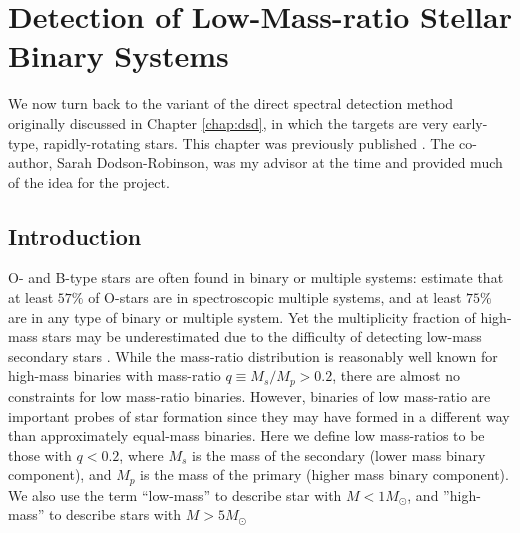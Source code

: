 

\chapter{Detection of Low-Mass-ratio Stellar Binary Systems}
\label{chap:pilot}
We now turn back to the variant of the direct spectral detection method originally discussed in Chapter \ref{chap:dsd}, in which the targets are very early-type, rapidly-rotating stars. This chapter was previously published \citep{Gullikson2013_2}. The co-author, Sarah Dodson-Robinson, was my advisor at the time and provided much of the idea for the project.


\section{Introduction}
O- and B-type stars are often found in binary or
multiple systems: \cite{Mason2009} estimate that at least $57\%$ of O-stars are
in spectroscopic multiple systems, and at least $75\%$ are in any type of binary or multiple system.
Yet the multiplicity fraction of high-mass stars may be underestimated due to the difficulty of detecting low-mass secondary stars \citep{Sana2011}.  While the mass-ratio distribution
is reasonably well known for high-mass binaries with mass-ratio $q \equiv M_s/M_p > 0.2$, there are almost no
constraints for low mass-ratio binaries. However, binaries of low mass-ratio are important probes of star formation since they may have
formed in a different way than approximately equal-mass binaries. Here we define low mass-ratios to be 
those with $q < 0.2$, where $M_s$ is the mass of the secondary (lower mass binary component), and $M_p$ 
is the mass of the primary (higher mass binary component). We also use the term ``low-mass'' to 
describe star with $M < 1 M_{\odot}$, and ''high-mass'' to describe stars with $M > 5 
M_{\odot}$


